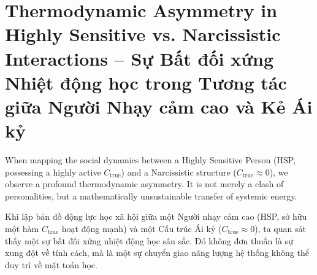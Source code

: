 \documentclass{report}
\begin{document}
\section{Thermodynamic Asymmetry in Highly Sensitive vs. Narcissistic Interactions -- Sự Bất đối xứng Nhiệt động học trong Tương tác giữa Người Nhạy cảm cao và Kẻ Ái kỷ}

When mapping the social dynamics between a Highly Sensitive Person (HSP, possessing a highly active $C_{\text{true}}$) and a Narcissistic structure ($C_{\text{true}} \approx 0$), we observe a profound thermodynamic asymmetry. It is not merely a clash of personalities, but a mathematically unsustainable transfer of systemic energy.

Khi lập bản đồ động lực học xã hội giữa một Người nhạy cảm cao (HSP, sở hữu một hàm $C_{\text{true}}$ hoạt động mạnh) và một Cấu trúc Ái kỷ ($C_{\text{true}} \approx 0$), ta quan sát thấy một sự bất đối xứng nhiệt động học sâu sắc. Đó không đơn thuần là sự xung đột về tính cách, mà là một sự chuyển giao năng lượng hệ thống không thể duy trì về mặt toán học.
\end{document}
